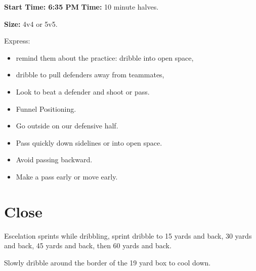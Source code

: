 \documentclass[10pt,letterpaper]{article}
\newenvironment{oddBlock}[1]{%
    \tcolorbox[beamer,%
    noparskip,breakable,
    colback=LightBlue,colframe=DarkBlue,%
    colbacklower=DarkBlue!75!LightBlue,%
    title=#1]}%
    {\endtcolorbox}
\begin{document}
\begin{oddBlock}{Small Sided}
    \textbf{Start Time: 6:35 PM}
    \textbf{Time:} 10 minute halves.

    \textbf{Size:} 4v4 or 5v5.

    Express:
    \begin{itemize}
        \setlength{\itemsep}{0pt}
        \setlength{\parskip}{0pt}
        \setlength{\parsep}{0pt}
        \item  remind them about the practice: dribble into open space,
        \item dribble to pull defenders away from teammates,
        \item Look to beat a defender and shoot or pass.
        \item Funnel Positioning.
        \item Go outside on our defensive half.
        \item Pass quickly down sidelines or into open space.
        \item Avoid passing backward.
        \item Make a pass early or move early.
    \end{itemize}

\end{oddBlock}

\section{Close}
\begin{oddBlock}{Sprints}
    Escelation sprints while dribbling, sprint dribble to 15 yards and back, 30 yards and back, 45 yards and back, then 60 yards and back.

    \vspace{12pt}
    
    Slowly dribble around the border of the 19 yard box to cool down.

\end{oddBlock}
\end{document}

